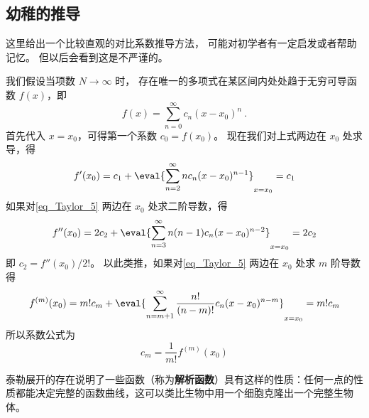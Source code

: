 \subsection{幼稚的推导}
这里给出一个比较直观的对比系数推导方法， 可能对初学者有一定启发或者帮助记忆。 但以后会看到这是不严谨的。

我们假设当项数 $N \to \infty$ 时， 存在唯一的多项式在某区间内处处趋于无穷可导函数 $f(x)$，即
\begin{equation}\label{eq_Taylor_5}
f(x) = \sum_{n = 0}^\infty  c_n (x - x_0)^n~.
\end{equation}
首先代入 $x = x_0$，可得第一个系数 $c_0 = f(x_0)$。 现在我们对上式两边在 $x_0$ 处求导，得
\begin{equation}
f'(x_0) = c_1 + \eval{ \sum_{n = 2}^\infty n c_n (x - x_0)^{n - 1} }_{x = x_0}  = c_1
\end{equation}
如果对\autoref{eq_Taylor_5} 两边在 $x_0$ 处求二阶导数，得
\begin{equation}
f''(x_0) = 2 c_2 + \eval{ \sum_{n = 3}^\infty  n(n - 1) c_n (x - x_0)^{n - 2} }_{x = x_0}  = 2 c_2
\end{equation}
即 $c_2 = f''(x_0)/2!$。  以此类推，如果对\autoref{eq_Taylor_5} 两边在 $x_0$ 处求 $m$ 阶导数得
\begin{equation}
f^{(m)}(x_0) = m! c_m + \eval{ \sum_{n = m + 1}^\infty  \frac{n!}{(n - m)!} c_n (x - x_0)^{n - m} }_{x = x_0}  = m! c_m
\end{equation}
所以系数公式为
\begin{equation}
{c_m} = \frac{1}{m!} f^{(m)}(x_0)
\end{equation}

泰勒展开的存在说明了一些函数（称为\textbf{解析函数}）具有这样的性质：任何一点的性质都能决定完整的函数曲线，这可以类比生物中用一个细胞克隆出一个完整生物体。
